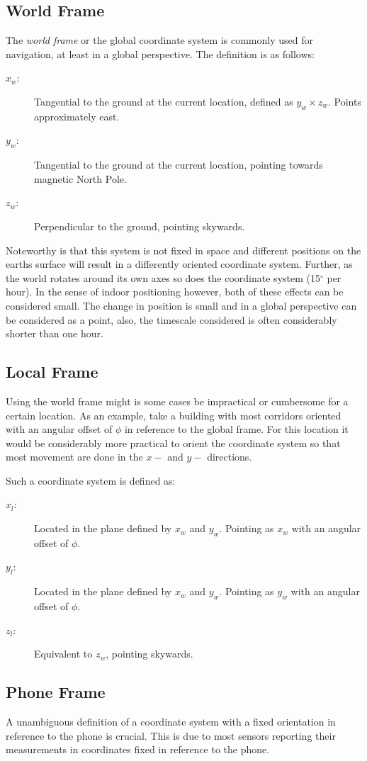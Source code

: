 \documentclass{LTHthesis}
\begin{document}
\subsection{World Frame}
%
The \emph{world frame} or the global coordinate system is commonly used for navigation, at least in a global perspective. The definition is as follows:
%
\begin{description}
\item[$x_w$:] Tangential to the ground at the current location, defined as $y_w\times z_w$. Points approximately east. 
\item[$y_w$:] Tangential to the ground at the current location, pointing towards magnetic North Pole.
\item[$z_w$:] Perpendicular to the ground, pointing skywards.
\end{description}
%
Noteworthy is that this system is not fixed in space and different positions on the earths surface will result in a differently oriented coordinate system. Further, as the world rotates around its own axes so does the coordinate system (15$^\circ$ per hour). In the sense of indoor positioning however, both of these effects can be considered small. The change in position is small and in a global perspective can be considered as a point, also, the timescale considered is often considerably shorter than one hour. 
%
\subsection{Local Frame}
%
Using the world frame might is some cases be impractical or cumbersome for a certain location. As an example, take a  building with most corridors oriented with an angular offset of $\phi$ in reference to the global frame. For this location it would be considerably more practical to orient the coordinate system so that most movement are done in the $x-$ and $y-$ directions.   

Such a coordinate system is defined as:
%
\begin{description}
\item[$x_l$:] Located in the plane defined by $x_w$ and $y_w$. Pointing as $x_w$ with an angular offset of $\phi$.
\item[$y_l$:] Located in the plane defined by $x_w$ and $y_w$. Pointing as $y_w$ with an angular offset of $\phi$.
\item[$z_l$:] Equivalent to $z_w$, pointing skywards.
\end{description}
%
\subsection{Phone Frame}
%
A unambiguous definition of a coordinate system with a fixed orientation in reference to the phone is crucial. This is due to most sensors reporting their measurements in coordinates fixed in reference to the phone. 
\end{document}
